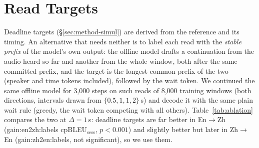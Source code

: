 \begin{table}[h]
\centering\small
\setlength{\tabcolsep}{3pt}
\caption{Audit of the Chinese AMI meetings. Left out in the end: 19{,}081 of 123{,}353 utterances (CER 13{,}681; no
translation 5{,}295; long pauses 98; other 7).}
\label{tab:zhaudit}
\end{table}

\section{Read Targets}
\label{app:labels}



Deadline targets (\S\ref{sec:method-simul}) are derived from the reference and its timing. An alternative that needs
neither is to label each read with the \emph{stable prefix} of the model's own output: the offline model drafts a
continuation from the audio heard so far and another from the whole window, both after the same committed prefix, and
the target is the longest common prefix of the two (speaker and time tokens included), followed by the wait token. We
continued the same offline model for 3{,}000 steps on such reads of 8{,}000 training windows (both directions,
intervals drawn from $\{0.5,1,1,2\}$\,s) and decode it with the same plain wait rule (greedy, the wait token
competing with all others). Table~\ref{tab:ablation} compares
the two at $\Delta=1$\,s: deadline targets are far better in En$\rightarrow$Zh (\num{gain:en2zh:labels} cpBLEU$_\text{sess}$,
$p<0.001$) and slightly better but later in Zh$\rightarrow$En (\num{gain:zh2en:labels}, not significant), so we use them.

